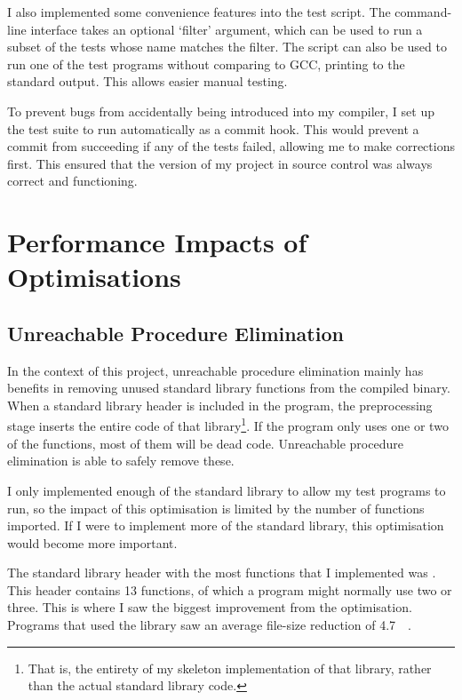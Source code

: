 \documentclass[00-main.tex]{subfiles}
\begin{document}
I also implemented some convenience features into the test script.
The command-line interface takes an optional `filter' argument, which can be used to run a subset of the tests whose name matches the filter.
The script can also be used to run one of the test programs without comparing to GCC, printing to the standard output. This allows easier manual testing.

To prevent bugs from accidentally being introduced into my compiler, I set up the test suite to run automatically as a commit hook. This would prevent a commit from succeeding if any of the tests failed, allowing me to make corrections first.
This ensured that the version of my project in source control was always correct and functioning.




\section{Performance Impacts of Optimisations}

\subsection{Unreachable Procedure Elimination}


In the context of this project, unreachable procedure elimination mainly has benefits in removing unused standard library functions from the compiled binary.
When a standard library header is included in the program, the preprocessing stage inserts the entire code of that library\footnote{That is, the entirety of my skeleton implementation of that library, rather than the actual standard library code.}.
If the program only uses one or two of the functions, most of them will be dead code.
Unreachable procedure elimination is able to safely remove these.

I only implemented enough of the standard library to allow my test programs to run, so the impact of this optimisation is limited by the number of functions imported.
If I were to implement more of the standard library, this optimisation would become more important.

The standard library header with the most functions that I implemented was .
This header contains 13 functions, of which a program might normally use two or three.
This is where I saw the biggest improvement from the optimisation.
Programs that used the  library saw an average file-size reduction of \SI{4.7}{\kilo\byte}.
\end{document}
